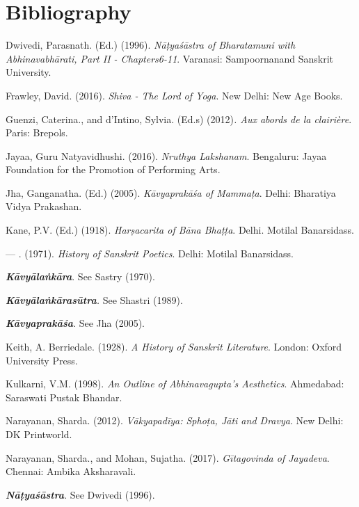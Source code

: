 \section*{Bibliography}

\begin{thebibliography}{99}
\itemsep=0pt
 Dwivedi, Parasnath. (Ed.) (1996). \textit{Nāṭyaśāstra of Bharatamuni with Abhinavabhārati, Part II - Chapters6-11}. Varanasi: Sampoornanand Sanskrit University.

  Frawley, David. (2016). \textit{Shiva - The Lord of Yoga}. New Delhi: New Age Books.

  Guenzi, Caterina., and d’Intino, Sylvia. (Ed.s) (2012)\textit{. Aux abords de la clairière}. Paris: Brepols.

  Jayaa, Guru Natyavidhushi. (2016). \textit{Nruthya Lakshanam}. Bengaluru: Jayaa Foundation for the Promotion of Performing Arts.

  Jha, Ganganatha. (Ed.) (2005). \textit{Kāvyaprakāśa of Mammaṭa}. Delhi: Bharatiya Vidya Prakashan.

  Kane, P.V. (Ed.) (1918). \textit{Harṣacarita of Bāna Bhaṭṭa}. Delhi. Motilal Banarsidass.

  — . (1971). \textit{History of Sanskrit Poetics}. Delhi: Motilal Banarsidass.

  \textit{\textbf{Kāvyālaṅkāra}}. See Sastry (1970).

  \textit{\textbf{Kāvyālaṅkārasūtra}. }See Shastri (1989).

  \textit{\textbf{Kāvyaprakāśa}}. See Jha (2005).

  Keith, A. Berriedale. (1928). \textit{A History of Sanskrit Literature}. London: Oxford University Press.

  Kulkarni, V.M. (1998). \textit{An Outline of Abhinavagupta’s Aesthetics}. Ahmedabad: Saraswati Pustak Bhandar.

  Narayanan, Sharda. (2012). \textit{Vākyapadīya: Sphoṭa, Jāti and Dravya}. New Delhi: DK Printworld.

  Narayanan, Sharda., and Mohan, Sujatha. (2017).\textit{ Gītagovinda of Jayadeva}. Chennai: Ambika Aksharavali.

  \textit{\textbf{Nāṭyaśāstra}}. See Dwivedi (1996).


\end{thebibliography}
